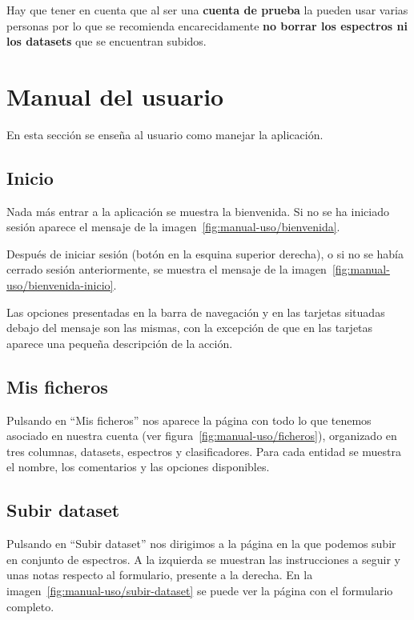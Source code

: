 Hay que tener en cuenta que al ser una \textbf{cuenta de prueba} la pueden usar 
varias personas por lo que se recomienda encarecidamente \textbf{no borrar los 
espectros ni los datasets} que se encuentran subidos.

\section{Manual del usuario}

En esta sección se enseña al usuario como manejar la aplicación.

\subsection{Inicio}

Nada más entrar a la aplicación se muestra la bienvenida. Si no se ha iniciado 
sesión aparece el mensaje de la imagen~\ref{fig:manual-uso/bienvenida}.


Después de iniciar sesión (botón en la esquina superior derecha), o si no se 
había cerrado sesión anteriormente, se muestra el mensaje de la 
imagen~\ref{fig:manual-uso/bienvenida-inicio}.


Las opciones presentadas en la barra de navegación y en las tarjetas situadas 
debajo del mensaje son las mismas, con la excepción de que en las tarjetas 
aparece una pequeña descripción de la acción.

\subsection{Mis ficheros}

Pulsando en ``Mis ficheros'' nos aparece la página con todo lo que tenemos 
asociado en nuestra cuenta (ver figura~\ref{fig:manual-uso/ficheros}), 
organizado en tres columnas, datasets, espectros y clasificadores. Para cada 
entidad se muestra el nombre, los comentarios y las opciones disponibles.


\subsection{Subir dataset}

Pulsando en ``Subir dataset'' nos dirigimos a la página en la que podemos subir 
en conjunto de espectros. A la izquierda se muestran las instrucciones a seguir 
y unas notas respecto al formulario, presente a la derecha. En la 
imagen~\ref{fig:manual-uso/subir-dataset} se puede ver la página con el 
formulario completo.

